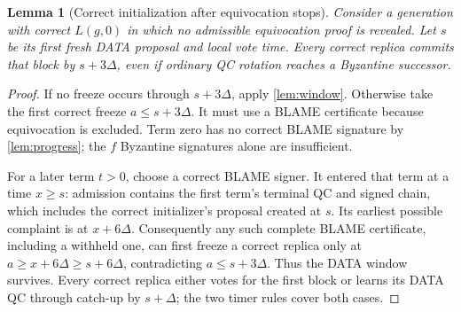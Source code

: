 \documentclass[11pt,a4paper]{article}
\newtheorem{lemma}[lemma]{Lemma}
\begin{document}
\begin{lemma}[Correct initialization after equivocation stops]
\label{lem:initializer}
Consider a generation with correct $L(g,0)$ in which no admissible
equivocation proof is revealed. Let $s$ be its first fresh DATA proposal
and local vote time. Every correct replica commits that block by
$s+3\Delta$, even if ordinary QC rotation reaches a Byzantine successor.
\end{lemma}
\begin{proof}
If no freeze occurs through $s+3\Delta$, apply \cref{lem:window}.
Otherwise take the first correct freeze $a\le s+3\Delta$.
It must use a BLAME certificate because equivocation is excluded.
Term zero has no correct BLAME signature by \cref{lem:progress};
the $f$ Byzantine signatures alone are insufficient.

For a later term $t>0$, choose a correct BLAME signer. It entered that
term at a time $x\ge s$: admission contains the first term's terminal
QC and signed chain, which includes the correct initializer's proposal
created at $s$. Its earliest possible complaint is at $x+6\Delta$.
Consequently any such complete BLAME certificate, including a withheld
one, can first freeze a correct replica only at
$a\ge x+6\Delta\ge s+6\Delta$, contradicting $a\le s+3\Delta$.
Thus the DATA window survives. Every correct replica either votes for
the first block or learns its DATA QC through catch-up by $s+\Delta$;
the two timer rules cover both cases.
\end{proof}
\end{document}

